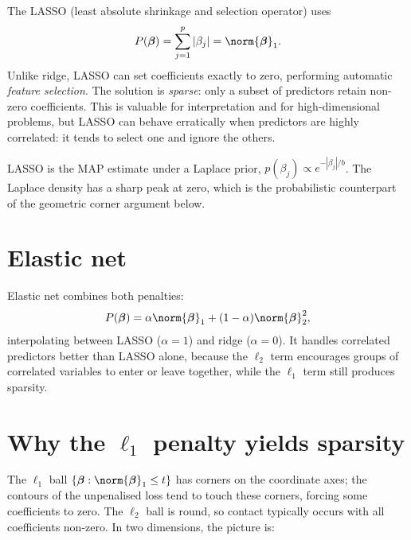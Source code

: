 \documentclass[a4paper, 12pt]{book}
\begin{document}
The LASSO (least absolute shrinkage and selection operator) uses
\begin{align}
    P(\boldsymbol{\beta}) = \sum_{j=1}^p |\beta_j| = \norm{\boldsymbol{\beta}}_1.
\end{align}
Unlike ridge, LASSO can set coefficients exactly to zero, performing automatic
\emph{feature selection}. The solution is \emph{sparse}: only a subset of predictors
retain non-zero coefficients. This is valuable for interpretation and for
high-dimensional problems, but LASSO can behave erratically when predictors are
highly correlated: it tends to select one and ignore the others.

LASSO is the MAP estimate under a Laplace prior,
$p(\beta_j) \propto e^{-|\beta_j|/b}$. The Laplace density has a sharp peak at zero,
which is the probabilistic counterpart of the geometric corner argument below.

\section{Elastic net}

Elastic net combines both penalties:
\begin{align}
    P(\boldsymbol{\beta})
    = \alpha\norm{\boldsymbol{\beta}}_1 + (1-\alpha)\norm{\boldsymbol{\beta}}_2^2,
\end{align}
interpolating between LASSO ($\alpha=1$) and ridge ($\alpha=0$). It handles
correlated predictors better than LASSO alone, because the $\ell_2$ term encourages
groups of correlated variables to enter or leave together, while the $\ell_1$ term
still produces sparsity.

\section{Why the $\ell_1$ penalty yields sparsity}

The $\ell_1$ ball $\{\boldsymbol{\beta}: \norm{\boldsymbol{\beta}}_1 \leq t\}$ has
corners on the coordinate axes; the contours of the unpenalised loss tend to touch
these corners, forcing some coefficients to zero. The $\ell_2$ ball is round, so
contact typically occurs with all coefficients non-zero. In two dimensions, the
picture is:
\end{document}
